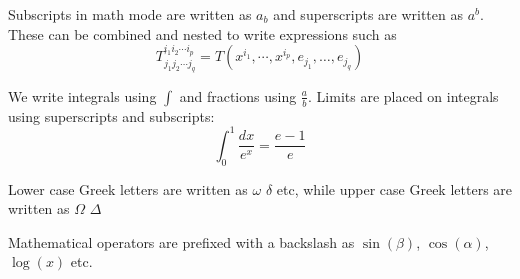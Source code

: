 \documentclass{article}
\begin{document}
    Subscripts in math mode are written as $a_b$ and superscripts are written as $a^b$.
    These can be combined and nested to write expressions such as
    \[
        T^{i_1 i_2 \cdots i_p}_{j_1 j_2 \cdots j_q} = T(x^{i_1}, \cdots, x^{i_p}, e_{j_1}, \dots, e_{j_q})
    \]

    We write integrals using $\int$ and fractions using $\frac{a}{b}$.
    Limits are placed on integrals using superscripts and subscripts:
    \[
        \int_0^1 \frac{dx}{e^x} = \frac{e-1}{e}
    \]

    Lower case Greek letters are written as $\omega$ $\delta$ etc, while upper case Greek letters are written as
    $\Omega$ $\Delta$

    Mathematical operators are prefixed with a backslash as $\sin(\beta)$, $\cos(\alpha)$, $\log(x)$ etc.
\end{document}
